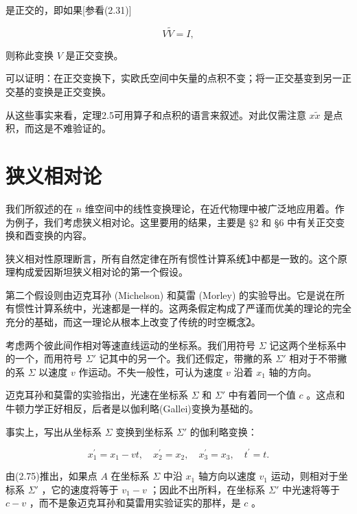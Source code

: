 是正交的，即如果[参看(2.31)]

\begin{equation*}
V \widetilde {V} = I,
\end{equation*}

则称此变换 $V$ 是正交变换。

可以证明：在正交变换下，实欧氏空间中矢量的点积不变；将一正交基变到另一正交基的变换是正交变换。

从这些事实来看，定理2.5可用算子和点积的语言来叙述。对此仅需注意 $x \widetilde{x}$ 是点积，而这是不难验证的。

\section{狭义相对论}

我们所叙述的在 $n$ 维空间中的线性变换理论，在近代物理中被广泛地应用着。作为例子，我们考虑狭义相对论。这里要用的结果，主要是 §2 和 §6 中有关正交变换和酉变换的内容。

狭义相对性原理断言，所有自然定律在所有惯性计算系统\textcircled{1}中都是一致的。这个原理构成爱因斯坦狭义相对论的第一个假设。

第二个假设则由迈克耳孙 (Michelson) 和莫雷 (Morley) 的实验导出。它是说在所有惯性计算系统中，光速都是一样的。这两条假定构成了严谨而优美的理论的完全充分的基础，而这一理论从根本上改变了传统的时空概念\textcircled{2}。

考虑两个彼此间作相对等速直线运动的坐标系。我们用符号 $\Sigma$ 记这两个坐标系中的一个，而用符号 $\Sigma'$ 记其中的另一个。我们还假定，带撇的系 $\Sigma'$ 相对于不带撇的系 $\Sigma$ 以速度 $v$ 作运动。不失一般性，可认为速度 $v$ 沿着 $x_{1}$ 轴的方向。

迈克耳孙和莫雷的实验指出，光速在坐标系 $\Sigma$ 和 $\Sigma'$ 中有着同一个值 $c$ 。这点和牛顿力学正好相反，后者是以伽利略(Gallei)变换为基础的。

事实上，写出从坐标系 $\Sigma$ 变换到坐标系 $\Sigma'$ 的伽利略变换：

\begin{equation*}
x _ {1} ^ {\prime} = x _ {1} - v t, \quad x _ {2} ^ {\prime} = x _ {2}, \quad x _ {3} ^ {\prime} = x _ {3}, \quad t ^ {\prime} = t.\tag{2.75}
\end{equation*}

由(2.75)推出，如果点 $A$ 在坐标系 $\Sigma$ 中沿 $x_{1}$ 轴方向以速度 $v_{1}$ 运动，则相对于坐标系 $\Sigma'$ ，它的速度将等于 $v_{1} - v$ ；因此不出所料，在坐标系 $\Sigma'$ 中光速将等于 $c - v$ ，而不是象迈克耳孙和莫雷用实验证实的那样，是 $c$ 。

